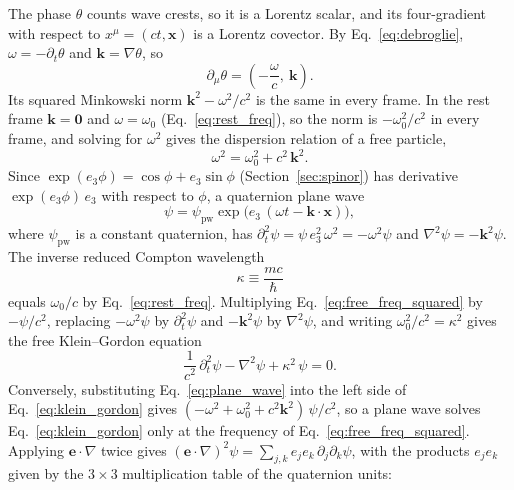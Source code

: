 \documentclass[aps,prd,onecolumn,tightenlines,nofootinbib,notitlepage,11pt,floatfix]{revtex4-2}
\theoremstyle{indentedtheorem}
\begin{document}
The phase $\theta$ counts wave crests, so it is a Lorentz scalar, and its four-gradient with respect to $x^\mu=(ct,\mathbf{x})$ is a Lorentz covector. By Eq.~\eqref{eq:debroglie}, $\omega=-\partial_t\theta$ and $\mathbf{k}=\nabla\theta$, so
\begin{equation}
    \partial_\mu\theta = \left(-\frac{\omega}{c},\ \mathbf{k}\right) .
    \label{eq:phase_fourvector}
\end{equation}
Its squared Minkowski norm $\mathbf{k}^2-\omega^2/c^2$ is the same in every frame. In the rest frame $\mathbf{k}=\mathbf{0}$ and $\omega=\omega_0$ (Eq.~\eqref{eq:rest_freq}), so the norm is $-\omega_0^2/c^2$ in every frame, and solving for $\omega^2$ gives the dispersion relation of a free particle,
\begin{equation}
    \omega^2 = \omega_0^2 + c^2\,\mathbf{k}^2 .
    \label{eq:free_freq_squared}
\end{equation}
Since $\exp(e_3\phi)=\cos\phi+e_3\sin\phi$ (Section~\ref{sec:spinor}) has derivative $\exp(e_3\phi)\,e_3$ with respect to $\phi$, a quaternion plane wave
\begin{equation}
    \psi = \psi_\text{pw}\exp\big(e_3\,(\omega t-\mathbf{k}\cdot\mathbf{x})\big) ,
    \label{eq:plane_wave}
\end{equation}
where $\psi_\text{pw}$ is a constant quaternion, has $\partial_t^2\psi=\psi\,e_3^2\,\omega^2=-\omega^2\psi$ and $\nabla^2\psi=-\mathbf{k}^2\psi$. The inverse reduced Compton wavelength
\begin{equation}
    \kappa \equiv \frac{mc}{\hbar}
    \label{eq:kappa_def}
\end{equation}
equals $\omega_0/c$ by Eq.~\eqref{eq:rest_freq}. Multiplying Eq.~\eqref{eq:free_freq_squared} by $-\psi/c^2$, replacing $-\omega^2\psi$ by $\partial_t^2\psi$ and $-\mathbf{k}^2\psi$ by $\nabla^2\psi$, and writing $\omega_0^2/c^2=\kappa^2$ gives the free Klein--Gordon equation~\citep{Klein1926Quantum,Gordon1926Compton}
\begin{equation}
    \frac{1}{c^2}\,\partial_t^2\psi - \nabla^2\psi + \kappa^2\,\psi = 0 .
    \label{eq:klein_gordon}
\end{equation}
Conversely, substituting Eq.~\eqref{eq:plane_wave} into the left side of Eq.~\eqref{eq:klein_gordon} gives $(-\omega^2+\omega_0^2+c^2\mathbf{k}^2)\,\psi/c^2$, so a plane wave solves Eq.~\eqref{eq:klein_gordon} only at the frequency of Eq.~\eqref{eq:free_freq_squared}.
Applying $\mathbf{e}\cdot\nabla$ twice gives $(\mathbf{e}\cdot\nabla)^2\psi = \sum_{j,k} e_j e_k\,\partial_j\partial_k\psi$, with the products $e_je_k$ given by the $3\times 3$ multiplication table of the quaternion units:
\end{document}
